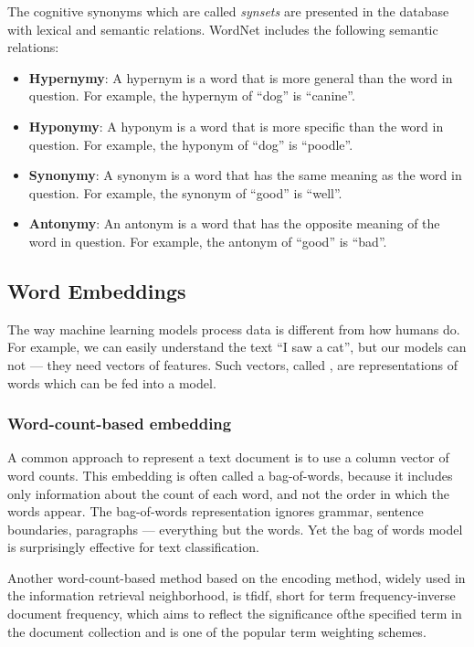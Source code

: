 The cognitive synonyms which are called \emph{synsets} are presented in the database with lexical and semantic relations. 
WordNet includes the following semantic relations:
\begin{itemize}
    \item \textbf{Hypernymy}: A hypernym is a word that is more general than the word in question. For example, the hypernym of “dog” is “canine”.
    \item \textbf{Hyponymy}: A hyponym is a word that is more specific than the word in question. For example, the hyponym of “dog” is “poodle”.
    \item \textbf{Synonymy}: A synonym is a word that has the same meaning as the word in question. For example, the synonym of “good” is “well”.
    \item \textbf{Antonymy}: An antonym is a word that has the opposite meaning of the word in question. For example, the antonym of “good” is “bad”.
\end{itemize}


\subsection{Word Embeddings}\label{subsec:word-embeddings}
The way machine learning models process data is different from how humans do. 
For example, we can easily understand the text “I saw a cat”, but our models can not --- they need vectors of features. 
Such vectors, called , are representations of words which can be fed into a model.


\subsubsection{Word-count-based embedding}\label{subsubsec:bag-of-words}
A common approach to represent a text document is to use a column vector of word counts.
This embedding is often called a \gls{bag-of-words}, because it includes only information about the count of each word, and not the order in which the words appear.
The bag-of-words representation ignores grammar, sentence boundaries, paragraphs — everything but the words. Yet the bag of words model is surprisingly effective for text classification.

Another word-count-based method based on the encoding method, widely used in the information retrieval neighborhood, is \acrshort{tfidf}, short for term frequency-inverse document frequency, which aims to reflect the significance ofthe specified term in the document collection and is one of the popular term weighting schemes.

